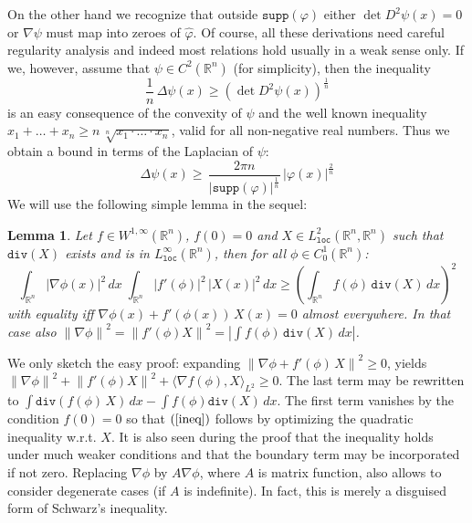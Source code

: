\documentclass[12pt,a4paper]{article}
\newcommand{\norm}[1]{\left\lVert#1\right\rVert}
\newcommand{\RR}[1]{\mathbb{R}^#1}
\newtheorem{lemma}{Lemma}
\begin{document}
\begin{appendices}
%
On the other hand we recognize that outside $\mathtt{supp}(\varphi)$ either 
$\det D^2\psi(x)=0$ or $\nabla\psi$ must map into zeroes of $\hat\varphi$.
Of course, all these derivations need careful regularity analysis and indeed
most relations hold usually in a weak sense only. If we, however, assume that
$\psi\in C^2(\RR n)$ (for simplicity), then the inequality
%
\begin{equation}\label{detineq}
       \frac{1}{n} \, \Delta \psi(x) \geq (\det D^2\psi(x))^\frac{1}{n}
\end{equation}  
%
is an easy consequence of the convexity of $\psi$ and the well known inequality
$x_1+\ldots+x_n\geq n\,\sqrt[n]{x_1\cdot\ldots\cdot x_n}$, valid for all 
non-negative real numbers. Thus we obtain a bound in terms of the Laplacian of
$\psi$: 
%
\begin{equation}
      \Delta \psi(x) \geq  \,
      \frac{2\pi n}{|\mathtt{supp}(\varphi)|^\frac{1}{n}}\,|\varphi(x)|^\frac{2}{n}
\end{equation}
%
We will use the following simple lemma in the sequel:
%
\begin{lemma}
Let $f\in W^{1,\infty}(\RR n)$, $f(0)=0$ and $X\in L^2_{\mathtt{loc}}
(\RR n,\RR n)$ such that 
$\mathtt{div}(X)$ exists and is in $L^\infty_{\mathtt{loc}}(\RR n)$, then for all 
$\phi\in C^1_0(\RR n)$:
%
\begin{equation}\label{ineq}
     \int_{\RR n} |\nabla\phi(x)|^2\,dx \; 
     \int_{\RR n} |f'(\phi)|^2\, |X(x)|^2 \, dx \geq    
     \left(\int_{\RR n} f(\phi)\, \mathtt{div}(X) \, dx\right)^2
\end{equation}
with equality iff $\nabla\phi(x)+f'(\phi(x))\,X(x)=0$ almost everywhere. In that
case also $\norm{\nabla\phi}^2 = \norm{f'(\phi) X}^2 = |\int f(\phi)\,\mathtt{div}(X)\,dx|$.    
\end{lemma}
%
We only sketch the easy proof: expanding $\norm{\nabla\phi+f'(\phi)\,X}^2\geq 0$,
yields $\norm{\nabla\phi}^2+\norm{f'(\phi) X}^2 + \langle \nabla f(\phi),X\rangle_{L^2} \geq 0$. The last term may be rewritten to 
$\int \mathtt{div}(f(\phi)\,X)\,dx - \int f(\phi) \mathtt{div}(X)\,dx$. The
first term vanishes by the condition $f(0)=0$ so that $(\ref{ineq})$ follows
by optimizing the quadratic inequality w.r.t. $X$. It is also seen during the
proof that the inequality holds under much weaker conditions and that the 
boundary term may be incorporated if not zero. Replacing $\nabla\phi$ by 
$A\nabla\phi$, where $A$ is matrix function, also allows to consider degenerate
cases (if $A$ is indefinite). In fact, this is merely a disguised form of Schwarz's
inequality.


\end{appendices}
\end{document}
